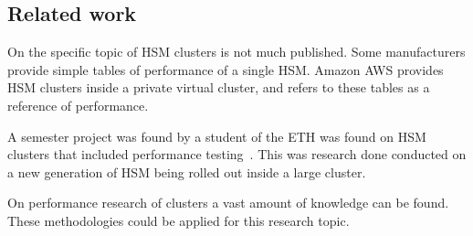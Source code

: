 \subsection*{Related work}
On the specific topic of HSM clusters is not much published.
Some manufacturers provide simple tables of performance of a single HSM.
Amazon AWS provides HSM clusters inside a private virtual cluster,
and refers to these tables as a reference of performance.

A semester project was found by a student of the ETH was found on HSM clusters that included performance testing~\cite{hsmperformance}.
This was research done conducted on a new generation of HSM being rolled out inside a large cluster.

On performance research of clusters a vast amount of knowledge can be found.
These methodologies could be applied for this research topic.
